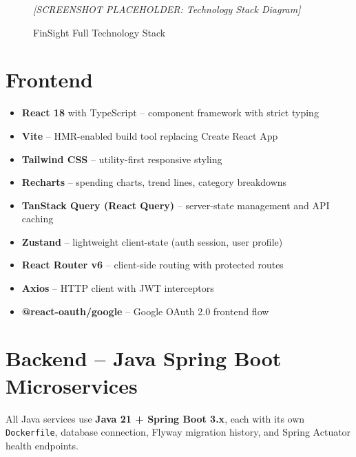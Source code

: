 \documentclass[12pt,a4paper]{report}
\begin{document}
\begin{figure}[H]
  \centering
  \begin{tcolorbox}[enhanced, colback=gray!10, colframe=gray!50,
      width=\linewidth, height=5cm, arc=6pt, valign=center, halign=center]
    \textcolor{gray!70}{\large\textit{[SCREENSHOT PLACEHOLDER: Technology Stack Diagram]}}
  \end{tcolorbox}
  \caption{FinSight Full Technology Stack}
\end{figure}

\section{Frontend}

\begin{techbox}
\begin{itemize}[leftmargin=1em, noitemsep]
  \item \textbf{React 18} with TypeScript -- component framework with strict typing
  \item \textbf{Vite} -- HMR-enabled build tool replacing Create React App
  \item \textbf{Tailwind CSS} -- utility-first responsive styling
  \item \textbf{Recharts} -- spending charts, trend lines, category breakdowns
  \item \textbf{TanStack Query (React Query)} -- server-state management and API caching
  \item \textbf{Zustand} -- lightweight client-state (auth session, user profile)
  \item \textbf{React Router v6} -- client-side routing with protected routes
  \item \textbf{Axios} -- HTTP client with JWT interceptors
  \item \textbf{@react-oauth/google} -- Google OAuth 2.0 frontend flow
\end{itemize}
\end{techbox}

\section{Backend -- Java Spring Boot Microservices}

All Java services use \textbf{Java 21 + Spring Boot 3.x}, each with its own \texttt{Dockerfile}, database connection, Flyway migration history, and Spring Actuator health endpoints.
\end{document}
